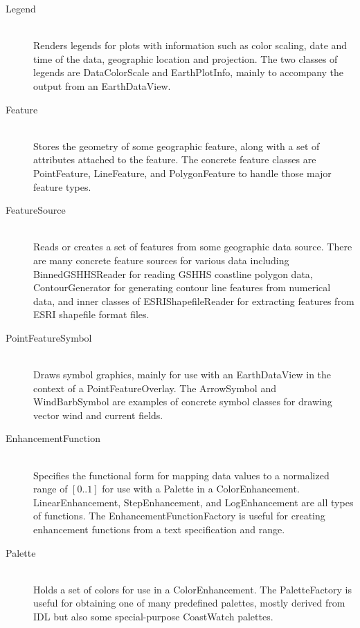 {\begin{description}
\item[{\java Legend}]~\\ Renders legends for plots with
information such as color scaling, date and time of the data,
geographic location and projection.  The two classes of legends
are {\java DataColorScale} and {\java EarthPlotInfo}, mainly to
accompany the output from an {\java EarthDataView}.

\item[{\java Feature}]~\\ Stores the geometry of some geographic
feature, along with a set of attributes attached to the feature.
The concrete feature classes are {\java PointFeature}, {\java
LineFeature}, and {\java PolygonFeature} to handle those major
feature types.

\item[{\java FeatureSource}]~\\ Reads or creates a set of
features from some geographic data source.  There are many
concrete feature sources for various data including {\java
BinnedGSHHSReader} for reading GSHHS coastline polygon data,
{\java ContourGenerator} for generating contour line features
from numerical data, and inner classes of {\java
ESRIShapefileReader} for extracting features from ESRI shapefile
format files.

\item[{\java PointFeatureSymbol}]~\\ Draws symbol graphics, mainly
for use with an {\java EarthDataView} in the context of a {\java
PointFeatureOverlay}.  The {\java ArrowSymbol} and {\java
WindBarbSymbol} are examples of concrete symbol classes for
drawing vector wind and current fields.

\item[{\java EnhancementFunction}]~\\ Specifies the functional
form for mapping data values to a normalized range of $[0..1]$
for use with a {\java Palette} in a {\java ColorEnhancement}.
{\java LinearEnhancement}, {\java StepEnhancement}, and {\java
LogEnhancement} are all types of functions.  The {\java
EnhancementFunctionFactory} is useful for creating enhancement
functions from a text specification and range.

\item[{\java Palette}]~\\ Holds a set of colors for use in a
{\java ColorEnhancement}.  The {\java PaletteFactory} is useful
for obtaining one of many predefined palettes, mostly derived
from IDL but also some special-purpose CoastWatch palettes.


\end{description}}
